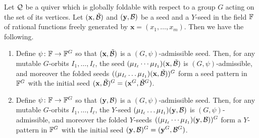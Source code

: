 \begin{proposition}\label{proposition:folded cluster pattern}
    Let $\mathcal{Q}$ be a quiver which is globally foldable with respect to a
    group $G$ acting on the set of its vertices. Let $(\mathbf{x},
    \mathcal{\tilde{B}})$ and $(\mathbf{y}, \mathcal{B})$ be a seed and a $Y$-seed in the field $\mathbb{F}$ of rational functions
    freely generated by $\mathbf{x} = (x_1,\dots,x_m)$. Then we have the following.
\begin{enumerate}
\item     Define $\psi \colon \mathbb{F}  \to \mathbb{F}^G$ so that
    $(\mathbf{x}, \mathcal{\tilde{B}})$ is a $(G, \psi)$-admissible seed. Then, for any mutable
    $G$-orbits $I_1,\dots,I_\ell$, the seed $(\mu_{I_\ell} \cdots 
    \mu_{I_1})(\mathbf{x},\mathcal{\tilde{B}})$ is $(G, \psi)$-admissible, and moreover the
    folded seeds $((\mu_{I_\ell}  \dots 
    \mu_{I_1})(\mathbf{x},\mathcal{\tilde{B}}))^G$ form a seed pattern in $\mathbb{F}^G$ 
    with the initial seed $(\mathbf{x},\mathcal{\tilde{B}})^G=(\mathbf{x}^G, \mathcal{\tilde{B}}^G)$.
\item Define $\psi \colon \mathbb{F}  \to \mathbb{F}^G$ so that
    $(\mathbf{y}, \mathcal{B})$ is a $(G, \psi)$-admissible seed. Then, for any mutable
    $G$-orbits $I_1,\dots,I_\ell$, the $Y$-seed $(\mu_{I_\ell} \dots 
    \mu_{I_1})(\mathbf{y},\mathcal{B})$ is $(G, \psi)$-admissible, and moreover the
    folded $Y$-seeds $((\mu_{I_\ell}  \cdots 
    \mu_{I_1})(\mathbf{y},\mathcal{B}))^G$ form a $Y$-pattern in $\mathbb{F}^G$ 
    with the initial seed $(\mathbf{y},\mathcal{B})^G=(\mathbf{y}^G, \mathcal{B}^G)$.
\end{enumerate}
\end{proposition}

